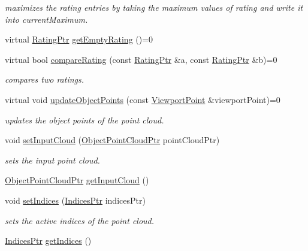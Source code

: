 \begin{DoxyCompactItemize}
\begin{DoxyCompactList}\small\item\em maximizes the rating entries by taking the maximum values of rating and write it into current\-Maximum. \end{DoxyCompactList}\item 
virtual \hyperlink{namespacenext__best__view_a24cf26ec1dec2cc4c167e32798d1abeb}{\-Rating\-Ptr} \hyperlink{classnext__best__view_1_1RatingModule_a81892991d0b55cabd588db1151033891}{get\-Empty\-Rating} ()=0
\item 
virtual bool \hyperlink{classnext__best__view_1_1RatingModule_a3ee6e5530fc0e09c8ae03c0b91ed4d06}{compare\-Rating} (const \hyperlink{namespacenext__best__view_a24cf26ec1dec2cc4c167e32798d1abeb}{\-Rating\-Ptr} \&a, const \hyperlink{namespacenext__best__view_a24cf26ec1dec2cc4c167e32798d1abeb}{\-Rating\-Ptr} \&b)=0
\begin{DoxyCompactList}\small\item\em compares two ratings. \end{DoxyCompactList}\item 
virtual void \hyperlink{classnext__best__view_1_1RatingModule_ad23bfcef2a0ee4fa6d90bc3b7d722bfc}{update\-Object\-Points} (const \hyperlink{namespacenext__best__view_adc2a48dc71f39dea04334b16d75a8e34}{\-Viewport\-Point} \&viewport\-Point)=0
\begin{DoxyCompactList}\small\item\em updates the object points of the point cloud. \end{DoxyCompactList}\item 
void \hyperlink{classnext__best__view_1_1RatingModule_ab8e5e44ff3ecf65d19fcd71144c920cf}{set\-Input\-Cloud} (\hyperlink{namespacenext__best__view_af8b3b448f67ab117bb7c59bc7c34f0b3}{\-Object\-Point\-Cloud\-Ptr} point\-Cloud\-Ptr)
\begin{DoxyCompactList}\small\item\em sets the input point cloud. \end{DoxyCompactList}\item 
\hyperlink{namespacenext__best__view_af8b3b448f67ab117bb7c59bc7c34f0b3}{\-Object\-Point\-Cloud\-Ptr} \hyperlink{classnext__best__view_1_1RatingModule_a4447e65611dd9dbba783c9883ea9faf5}{get\-Input\-Cloud} ()
\item 
void \hyperlink{classnext__best__view_1_1RatingModule_acf016d35296c34f09935a1a9472238b7}{set\-Indices} (\hyperlink{namespacenext__best__view_a89edd5f370254b5c7689adfede9fe6a7}{\-Indices\-Ptr} indices\-Ptr)
\begin{DoxyCompactList}\small\item\em sets the active indices of the point cloud. \end{DoxyCompactList}\item 
\hyperlink{namespacenext__best__view_a89edd5f370254b5c7689adfede9fe6a7}{\-Indices\-Ptr} \hyperlink{classnext__best__view_1_1RatingModule_a12830cb6ebf018af87213afc7ec9b089}{get\-Indices} ()
\end{DoxyCompactItemize}


